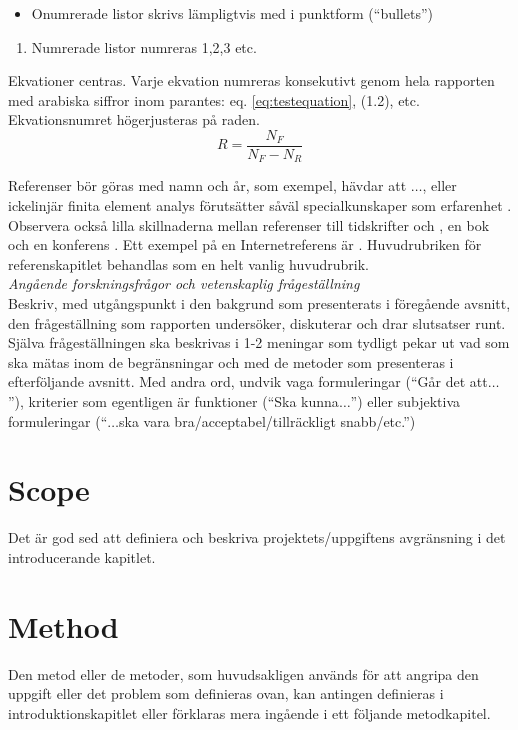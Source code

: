 \documentclass[a4paper,11pt]{kth-mag}
\begin{document}
\begin{itemize}
\item Onumrerade listor skrivs lämpligtvis med i punktform (``bullets'')
\end{itemize}

\begin{enumerate}
\item Numrerade listor numreras 1,2,3 etc.
\end{enumerate}

\noindent{}Ekvationer centras. Varje ekvation numreras konsekutivt genom hela rapporten med arabiska siffror inom parantes: eq. \eqref{eq:testequation}, (1.2), etc. Ekvationsnumret högerjusteras på raden.
\begin{equation}
R= \frac{N_F}{N_F-N_R} \label{eq:testequation}
\end{equation}

\noindent{}Referenser bör göras med namn och år, som exempel, \cite{Angell1999} hävdar att $\ldots$, eller ickelinjär finita element analys förutsätter såväl specialkunskaper som erfarenhet \cite{DeBorst2012}. Observera också lilla skillnaderna mellan referenser till tidskrifter \cite{VanWezel2001} och \cite{Angell1999}, en bok \cite{DeBorst2012} och en konferens \cite{Eppinger2001}. Ett exempel på en Internetreferens är \cite{StandishGroup1994}. Huvudrubriken för referenskapitlet behandlas som en helt vanlig huvudrubrik. \\


\noindent{}\emph{Angående forskningsfrågor och vetenskaplig frågeställning}\\
Beskriv, med utgångspunkt i den bakgrund som presenterats i föregående avsnitt, den frågeställning som rapporten undersöker, diskuterar och drar slutsatser runt. Själva frågeställningen ska beskrivas i 1-2 meningar som tydligt pekar ut vad som ska mätas inom de begränsningar och med de metoder som presenteras i efterföljande avsnitt. Med andra ord, undvik vaga formuleringar (``Går det att$\ldots$''), kriterier som egentligen är funktioner (``Ska kunna$\ldots$'') eller subjektiva formuleringar (``$\ldots$ska vara bra/acceptabel/tillräckligt snabb/etc.'')
\section{Scope}
Det är god sed att definiera och beskriva projektets/uppgiftens  avgränsning i det introducerande kapitlet.

\section{Method}
Den metod eller de metoder, som huvudsakligen används för att angripa den uppgift eller det problem som definieras ovan, kan antingen definieras i introduktionskapitlet eller förklaras mera ingående i ett följande metodkapitel.
\end{document}
